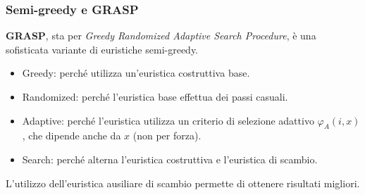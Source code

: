 \documentclass{article}
\begin{document}
\subsubsection{Semi-greedy e GRASP}
\textbf{GRASP}, sta per \textit{Greedy Randomized Adaptive Search Procedure}, è una sofisticata
variante di euristiche semi-greedy.
\begin{itemize}
    \item Greedy: perché utilizza un'euristica costruttiva base.
    \item Randomized: perché l'euristica base effettua dei passi casuali.
    \item Adaptive: perché l'euristica utilizza un criterio di selezione adattivo $\varphi_A (i,x)$,
          che dipende anche da $x$ (non per forza).
    \item Search: perché alterna l'euristica costruttiva e l'euristica di scambio.
\end{itemize}
L'utilizzo dell'euristica ausiliare di scambio permette di ottenere risultati migliori.
\end{document}
